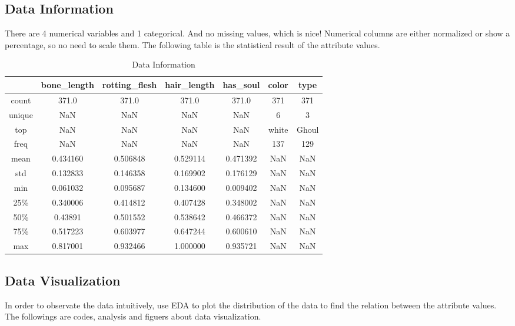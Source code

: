 \subsection{Data Information}
There are 4 numerical variables and 1 categorical. And no missing values, which is nice! Numerical columns are either normalized or show a percentage, so no need to scale them. The following table is the statistical result of the attribute values.


\begin{table}[h]  \centering
	\caption{Data Information}
	\label{tbl:data information}
	\begin{tabular}{ccccccc}
		\hline
		& bone_length & rotting_flesh & hair_length & has_soul & color & type\\
		\hline
		count & 371.0 & 371.0 & 371.0 & 371.0 & 371 & 371 \\
		unique & NaN & NaN & NaN & NaN & 6 & 3 \\
		top & NaN & NaN & NaN & NaN & white & Ghoul \\
		freq & NaN & NaN & NaN & NaN & 137 & 129\\
		mean & 0.434160 & 0.506848 & 0.529114 & 0.471392 & NaN & NaN \\
		std & 0.132833 & 0.146358 & 0.169902 & 0.176129 & NaN & NaN \\
		min & 0.061032 & 0.095687 & 0.134600 & 0.009402 & NaN & NaN \\
		25\% & 0.340006 & 0.414812 & 0.407428 & 0.348002 & NaN & NaN \\
		50\% & 0.43891 & 0.501552 & 0.538642 & 0.466372 & NaN & NaN\\
		75\% & 0.517223 & 0.603977 & 0.647244 & 0.600610 & NaN & NaN\\
		max &  0.817001 & 0.932466 & 1.000000 & 0.935721 & NaN & NaN\\
		\hline 
	\end{tabular}
\end{table}


\subsection{Data Visualization}
In order to observate the data intuitively, use EDA to plot the distribution of the data to find the relation between the attribute values. The followings are codes, analysis and figuers about data visualization.\\


